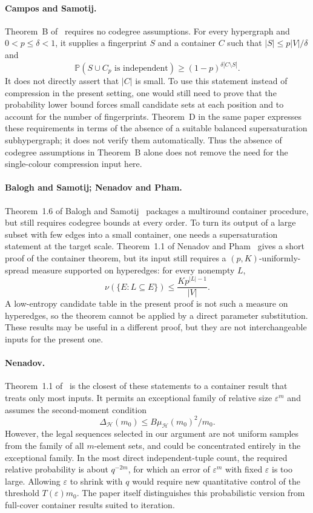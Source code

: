 \documentclass[11pt]{article}
\theoremstyle{definition}
\theoremstyle{remark}
\newcommand{\PP}{\mathbb P}
\newcommand{\eps}{\varepsilon}
\begin{document}
\paragraph{Campos and Samotij.}
Theorem~B of~\cite{CS} requires no codegree assumptions. For every
hypergraph and $0<p\le\delta<1$, it supplies a fingerprint $S$ and a
container $C$ such that $|S|\le p|V|/\delta$ and
\[
 \PP(S\cup C_p\text{ is independent})
 \ge(1-p)^{\delta|C\setminus S|}.
\]
It does not directly assert that $|C|$ is small. To use this statement
instead of compression in the present setting, one would still need
to prove that the probability lower bound forces small candidate sets
at each position and to account for the number of fingerprints.
Theorem~D in the same paper expresses these requirements in terms of
the absence of a suitable balanced supersaturation subhypergraph;
it does not verify them automatically. Thus the absence of codegree
assumptions in Theorem~B alone does not remove the need for the
single-colour compression input here.

\paragraph{Balogh and Samotij; Nenadov and Pham.}
Theorem~1.6 of Balogh and Samotij~\cite{BS} packages a multiround
container procedure, but still requires codegree bounds at every
order. To turn its output of a large subset with few edges into a
small container, one needs a supersaturation statement at the target
scale. Theorem~1.1 of Nenadov and Pham~\cite{NP} gives a short proof
of the container theorem, but its input still requires a
$(p,K)$-uniformly-spread measure supported on hyperedges: for every
nonempty $L$,
\[
 \nu(\{E:L\subseteq E\})\le\frac{Kp^{|L|-1}}{|V|}.
\]
A low-entropy candidate table in the present proof is not such a
measure on hyperedges, so the theorem cannot be applied by a direct
parameter substitution. These results may be useful in a different
proof, but they are not interchangeable inputs for the present one.

\paragraph{Nenadov.}
Theorem~1.1 of~\cite{N} is the closest of these statements to a
container result that treats only most inputs. It permits an
exceptional family of relative size $\eps^m$ and assumes the
second-moment condition
\[
 \Delta_{\mathcal H}(m_0)
 \le B\mu_{\mathcal H}(m_0)^2/m_0.
\]
However, the legal sequences selected in our argument are not uniform
samples from the family of all $m$-element sets, and could be
concentrated entirely in the exceptional family. In the most direct
independent-tuple count, the required relative probability is about
$q^{-2m}$, for which an error of $\eps^m$ with fixed $\eps$ is too
large. Allowing $\eps$ to shrink with $q$ would require new quantitative
control of the threshold $T(\eps)m_0$. The paper itself distinguishes
this probabilistic version from full-cover container results suited
to iteration.
\end{document}
